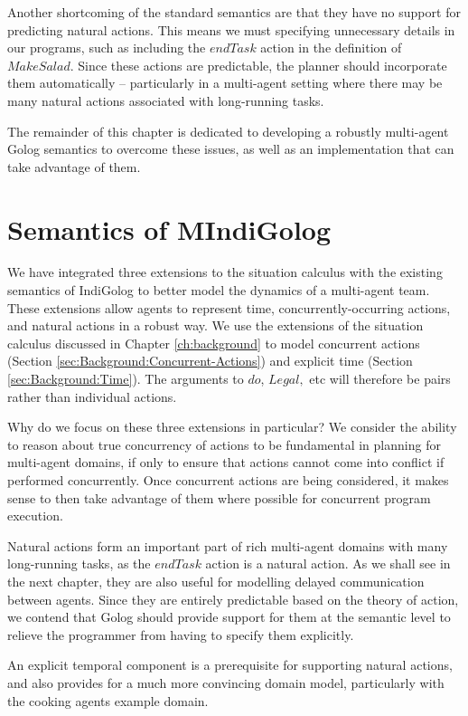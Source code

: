 Another shortcoming of the standard semantics are that they have no
support for predicting natural actions. This means we must specifying
unnecessary details in our programs, such as including the $endTask$
action in the definition of $MakeSalad$. Since these actions are
predictable, the planner should incorporate them automatically --
particularly in a multi-agent setting where there may be many natural
actions associated with long-running tasks.

The remainder of this chapter is dedicated to developing a robustly
multi-agent Golog semantics to overcome these issues, as well as an
implementation that can take advantage of them.


\section{Semantics of MIndiGolog\label{sec:MIndiGolog:Semantics}}

We have integrated three extensions to the situation calculus with
the existing semantics of IndiGolog to better model the dynamics of
a multi-agent team. These extensions allow agents to represent time,
concurrently-occurring actions, and natural actions in a robust way.
We use the extensions of the situation calculus discussed in Chapter
\ref{ch:background} to model concurrent actions (Section \ref{sec:Background:Concurrent-Actions})
and explicit time (Section \ref{sec:Background:Time}). The arguments
to $do$, $Legal,$ etc will therefore be 
pairs rather than individual actions.

Why do we focus on these three extensions in particular? We consider
the ability to reason about true concurrency of actions to be fundamental
in planning for multi-agent domains, if only to ensure that actions
cannot come into conflict if performed concurrently. Once concurrent
actions are being considered, it makes sense to then take advantage
of them where possible for concurrent program execution.

Natural actions form an important part of rich multi-agent domains
with many long-running tasks, as the $endTask$ action is a natural
action. As we shall see in the next chapter, they are also useful
for modelling delayed communication between agents. Since they are
entirely predictable based on the theory of action, we contend that
Golog should provide support for them at the semantic level to relieve
the programmer from having to specify them explicitly.

An explicit temporal component is a prerequisite for supporting natural
actions, and also provides for a much more convincing domain model,
particularly with the cooking agents example domain.


